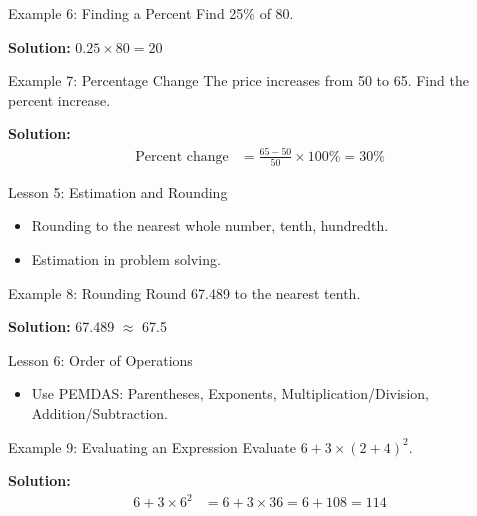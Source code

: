 \documentclass{beamer}
\begin{document}
\begin{frame}{Example 6: Finding a Percent}
Find 25\% of 80.

\textbf{Solution:} $0.25 \times 80 = 20$
\end{frame}

\begin{frame}{Example 7: Percentage Change}
The price increases from 50 to 65. Find the percent increase.

\textbf{Solution:}
\begin{align*}
\text{Percent change} &= \frac{65 - 50}{50} \times 100\% = 30\%
\end{align*}
\end{frame}


\begin{frame}{Lesson 5: Estimation and Rounding}
\begin{itemize}
    \item Rounding to the nearest whole number, tenth, hundredth.
    \item Estimation in problem solving.
\end{itemize}
\end{frame}

\begin{frame}{Example 8: Rounding}
Round 67.489 to the nearest tenth.

\textbf{Solution:} 67.489 $\approx$ 67.5
\end{frame}


\begin{frame}{Lesson 6: Order of Operations}
\begin{itemize}
    \item Use PEMDAS: Parentheses, Exponents, Multiplication/Division, Addition/Subtraction.
\end{itemize}
\end{frame}

\begin{frame}{Example 9: Evaluating an Expression}
Evaluate $6 + 3 \times (2 + 4)^2$.

\textbf{Solution:}
\begin{align*}
6 + 3 \times 6^2 &= 6 + 3 \times 36 = 6 + 108 = 114
\end{align*}
\end{frame}
\end{document}
